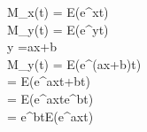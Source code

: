 M_x(t) = E(e^{xt})\\
M_y(t) = E(e^{yt})\\
y =ax+b\\
M_y(t) = E(e^{(ax+b)t})\\
= E(e^{axt+bt})\\
= E(e^{axt}e^{bt})\\
= e^{bt}E(e^{axt})